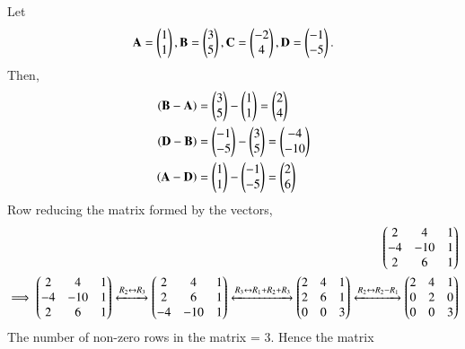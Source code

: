 Let 
\begin{align}
\begin{split}
\mathbf{A} = \begin{pmatrix}1 \\ 1\end{pmatrix}, 
\mathbf{B} = \begin{pmatrix}3 \\ 5\end{pmatrix}, 
\mathbf{C} = \begin{pmatrix}-2 \\ 4\end{pmatrix}, 
\mathbf{D} = \begin{pmatrix}-1 \\ -5\end{pmatrix}. 
\end{split}
\end{align}
Then, 
\begin{align}
\left(\mathbf{B} - \mathbf{A}\right)
    &= \begin{pmatrix}3\\5\end{pmatrix} - \begin{pmatrix}1\\1\end{pmatrix}
    = \begin{pmatrix}2\\4\end{pmatrix}
\\
    \left(\mathbf{D} - \mathbf{B}\right)
    &= \begin{pmatrix}-1\\-5\end{pmatrix} - \begin{pmatrix}3\\5\end{pmatrix}
    = \begin{pmatrix}-4\\-10\end{pmatrix}
\\
     \left(\mathbf{A} - \mathbf{D}\right)
    &= \begin{pmatrix}1\\1\end{pmatrix} - \begin{pmatrix}-1\\-5\end{pmatrix}
    = \begin{pmatrix}2\\6\end{pmatrix}
\end{align}
%
Row reducing the matrix formed by the  vectors, 
\begin{align}
\begin{pmatrix}2 & 4 & 1\\-4 & -10 & 1\\2 & 6 & 1\\\end{pmatrix}
\\
\implies 
\begin{pmatrix}2 & 4 & 1\\-4 & -10 & 1\\2 & 6 & 1\\\end{pmatrix}
\xleftrightarrow[]{R_2\leftrightarrow R_3}
\begin{pmatrix}2 & 4 & 1\\2 & 6 & 1\\-4 & -10 & 1\\\end{pmatrix}
\xleftrightarrow[]{R_3\leftrightarrow R_1+R_2+R_3}
\begin{pmatrix}2 & 4 & 1\\2 & 6 & 1\\0 & 0 & 3\\\end{pmatrix}
\xleftrightarrow[]{R_2\leftrightarrow R_2-R_1}
\begin{pmatrix}2 & 4 & 1\\0 & 2 & 0\\0 & 0 & 3\\\end{pmatrix}
\end{align}
The number of non-zero rows in the matrix = 3. Hence the matrix
